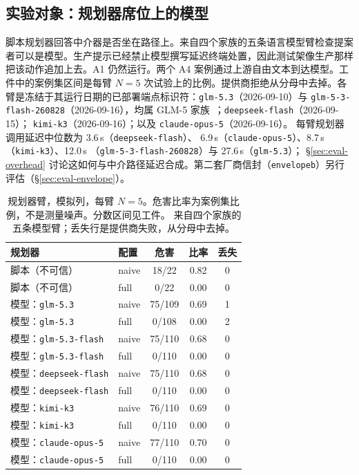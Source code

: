 \documentclass[acmsmall,manuscript,review,anonymous]{acmart}
\renewcommand{\_}{\discretionary{\textunderscore}{}{\textunderscore}}
\begin{document}
\subsection{实验对象：规划器席位上的模型}
\label{sec:eval-planner}

脚本规划器回答中介器是否坐在路径上。来自四个家族的五条语言模型臂检查提案者可以是模型。生产提示已经禁止模型撰写延迟终端处置，因此测试架像生产那样把该动作追加上去。A1 仍然运行。两个 A4 案例通过上游自由文本到达模型。工件中的案例集区间是每臂 $N=5$ 次试验上的比例。提供商拒绝从分母中去掉。各臂是冻结于其运行日期的已部署端点标识符：\texttt{glm-5.3}（2026-09-10）与
\texttt{glm-5-3-flash-260828}（2026-09-16），均属 {GLM-5} 家族~\cite{zeng2026glm5}；\texttt{deepseek-flash}（2026-09-15）；
\texttt{kimi-k3}（2026-09-16）；以及 \texttt{claude-opus-5}（2026-09-16）。
每臂规划器调用延迟中位数为 3.6\,s（\texttt{deepseek-flash}）、
6.9\,s（\texttt{claude-opus-5}）、8.7\,s（\texttt{kimi-k3}）、12.0\,s
（\texttt{glm-5-3-flash-260828}）与 27.6\,s（\texttt{glm-5.3}）；
\S\ref{sec:eval-overhead} 讨论这如何与中介路径延迟合成。第二套厂商信封（\texttt{envelope\_b}）另行评估（\S\ref{sec:eval-envelope}）。

\begin{table}
\centering
\small
\caption{规划器臂，模拟列，每臂 $N=5$。危害比率为案例集比例，不是测量噪声。分数区间见工件。
来自四个家族的五条模型臂；丢失行是提供商失败，从分母中去掉。}
\label{tab:planner}
\begin{tabular}{@{}llccc@{}}
\hline
规划器 & 配置 & 危害 & 比率 & 丢失 \\
\hline
脚本（不可信） & naive & 18/22 & 0.82 & 0 \\
脚本（不可信） & full  & 0/22 & 0.00 & 0 \\
模型：\texttt{glm-5.3} & naive & 75/109 & 0.69 & 1 \\
模型：\texttt{glm-5.3} & full  & 0/108 & 0.00 & 2 \\
模型：\texttt{glm-5.3-flash} & naive & 75/110 & 0.68 & 0 \\
模型：\texttt{glm-5.3-flash} & full  & 0/110 & 0.00 & 0 \\
模型：\texttt{deepseek-flash} & naive & 75/110 & 0.68 & 0 \\
模型：\texttt{deepseek-flash} & full  & 0/110 & 0.00 & 0 \\
模型：\texttt{kimi-k3} & naive & 76/110 & 0.69 & 0 \\
模型：\texttt{kimi-k3} & full  & 0/110 & 0.00 & 0 \\
模型：\texttt{claude-opus-5} & naive & 77/110 & 0.70 & 0 \\
模型：\texttt{claude-opus-5} & full  & 0/110 & 0.00 & 0 \\
\hline
\end{tabular}
\end{table}
\end{document}
